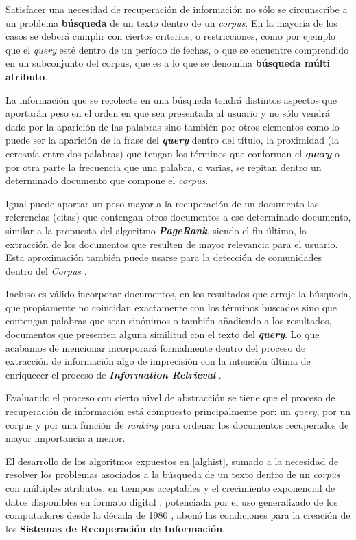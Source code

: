 \documentclass[
  10,
  openany]{book}
\begin{document}
Satisfacer una necesidad de recuperación de información no sólo se circunscribe a un problema \textbf{búsqueda} de un texto dentro de un \emph{corpus}. En la mayoría de los casos se deberá cumplir con ciertos criterios, o restricciones, como por ejemplo que el \emph{query} esté dentro de un período de fechas, o que se encuentre comprendido en un subconjunto del corpus, que es a lo que se denomina \textbf{búsqueda múlti atributo}.

La información que se recolecte en una búsqueda tendrá distintos aspectos que aportarán peso en el orden en que sea presentada al usuario y no sólo vendrá dado por la aparición de las palabras sino también por otros elementos como lo puede ser la aparición de la frase del \textbf{\emph{query}} dentro del título, la proximidad (la cercanía entre dos palabras) que tengan los términos que conforman el \textbf{\emph{query}} o por otra parte la frecuencia que una palabra, o varias, se repitan dentro un determinado documento que compone el \emph{corpus}.

Igual puede aportar un peso mayor a la recuperación de un documento las referencias (citas) que contengan otros documentos a ese determinado documento, similar a la propuesta del algoritmo \textbf{\emph{PageRank}}\citep{brin1998}, siendo el fin último, la extracción de los documentos que resulten de mayor relevancia para el usuario. Esta aproximación también puede usarse para la detección de comunidades dentro del \emph{Corpus} \citep{heydari2020analysis}.

Incluso es válido incorporar documentos, en los resultados que arroje la búsqueda, que propiamente no coincidan exactamente con los términos buscados sino que contengan palabras que sean sinónimos o también añadiendo a los resultados, documentos que presenten alguna similitud con el texto del \textbf{\emph{query}}. Lo que acabamos de mencionar incorporará formalmente dentro del proceso de extracción de información algo de imprecisión con la intención última de enriquecer el proceso de \textbf{\emph{Information Retrieval}} \citep{kraft2017}.

Evaluando el proceso con cierto nivel de abstracción se tiene que el proceso de recuperación de información está compuesto principalmente por: un \emph{query}, por un corpus y por una función de \emph{ranking} para ordenar los documentos recuperados de mayor importancia a menor.

El desarrollo de los algoritmos expuestos en \ref{alghist}, sumado a la necesidad de resolver los problemas asociados a la búsqueda de un texto dentro de un \emph{corpus} con múltiples atributos, en tiempos aceptables y el crecimiento exponencial de datos disponibles en formato digital \citep{worldde2016}, potenciada por el uso generalizado de los computadores desde la década de 1980 , abonó las condiciones para la creación de los \textbf{Sistemas de Recuperación de Información}.
\end{document}

